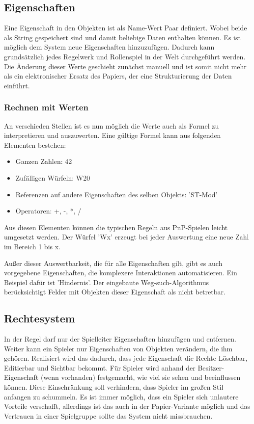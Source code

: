 \subsection{Eigenschaften}
\label{sec:Eigenschaften}
Eine Eigenschaft in den Objekten ist als Name-Wert Paar definiert. Wobei beide als String gespeichert sind und damit beliebige Daten enthalten können. Es ist möglich dem System neue Eigenschaften hinzuzufügen. Dadurch kann grundsätzlich jedes Regelwerk und Rollenspiel in der Welt durchgeführt werden. Die Änderung dieser Werte geschieht zunächst manuell und ist somit nicht mehr als ein elektronischer Ersatz des Papiers, der eine Strukturierung der Daten einführt.\newline

\subsubsection{Rechnen mit Werten}
An verschieden Stellen ist es nun möglich die Werte auch als Formel zu interpretieren und auszuwerten. Eine gültige Formel kann aus folgenden Elementen bestehen:
\begin{itemize}
	\item Ganzen Zahlen: 42
	\item Zufälligen Würfeln: W20
	\item Referenzen auf andere Eigenschaften des selben Objekts: 'ST-Mod'
	\item Operatoren: +, -, *, /
\end{itemize}

Aus diesen Elementen können die typischen Regeln aus PnP-Spielen leicht umgesetzt werden. Der Würfel 'Wx' erzeugt bei jeder Auswertung eine neue Zahl im Bereich 1 bis x.

Außer dieser Auswertbarkeit, die für alle Eigenschaften gilt, gibt es auch vorgegebene Eigenschaften, die komplexere Interaktionen automatisieren.\newline
Ein Beispiel dafür ist 'Hindernis'. Der eingebaute Weg-such-Algorithmus berücksichtigt Felder mit Objekten dieser Eigenschaft als nicht betretbar.

\subsection{Rechtesystem}
\label{sec:Rechtesystem}
In der Regel darf nur der Spielleiter Eigenschaften hinzufügen und entfernen. Weiter kann ein Spieler nur Eigenschaften von Objekten verändern, die ihm gehören. Realisiert wird das dadurch, dass jede Eigenschaft die Rechte Löschbar, Editierbar und Sichtbar bekommt. Für Spieler wird anhand der Besitzer-Eigenschaft (wenn vorhanden) festgemacht, wie viel sie sehen und beeinflussen können.\newline
Diese Einschränkung soll verhindern, dass Spieler im großen Stil anfangen zu schummeln. Es ist immer möglich, dass ein Spieler sich unlautere Vorteile verschafft, allerdings ist das auch in der Papier-Variante möglich und das Vertrauen in einer Spielgruppe sollte das System nicht missbrauchen.

